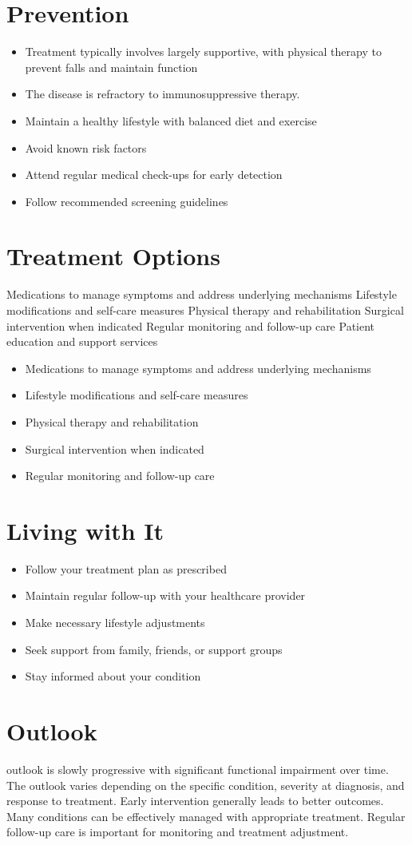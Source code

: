 \section{Prevention}
\begin{itemize}[noitemsep]
  \item Treatment typically involves largely supportive, with physical therapy to prevent falls and maintain function
  \item The disease is refractory to immunosuppressive therapy.
  \item Maintain a healthy lifestyle with balanced diet and exercise
  \item Avoid known risk factors
  \item Attend regular medical check-ups for early detection
  \item Follow recommended screening guidelines
\end{itemize}
\section{Treatment Options}
Medications to manage symptoms and address underlying mechanisms Lifestyle modifications and self-care measures Physical therapy and rehabilitation Surgical intervention when indicated Regular monitoring and follow-up care Patient education and support services

\begin{itemize}[noitemsep]
  \item Medications to manage symptoms and address underlying mechanisms
  \item Lifestyle modifications and self-care measures
  \item Physical therapy and rehabilitation
  \item Surgical intervention when indicated
  \item Regular monitoring and follow-up care
\end{itemize}
\section{Living with It}
\begin{itemize}[noitemsep]
  \item Follow your treatment plan as prescribed
  \item Maintain regular follow-up with your healthcare provider
  \item Make necessary lifestyle adjustments
  \item Seek support from family, friends, or support groups
  \item Stay informed about your condition
\end{itemize}
\section{Outlook}
outlook is slowly progressive with significant functional impairment over time. The outlook varies depending on the specific condition, severity at diagnosis, and response to treatment. Early intervention generally leads to better outcomes. Many conditions can be effectively managed with appropriate treatment. Regular follow-up care is important for monitoring and treatment adjustment.
